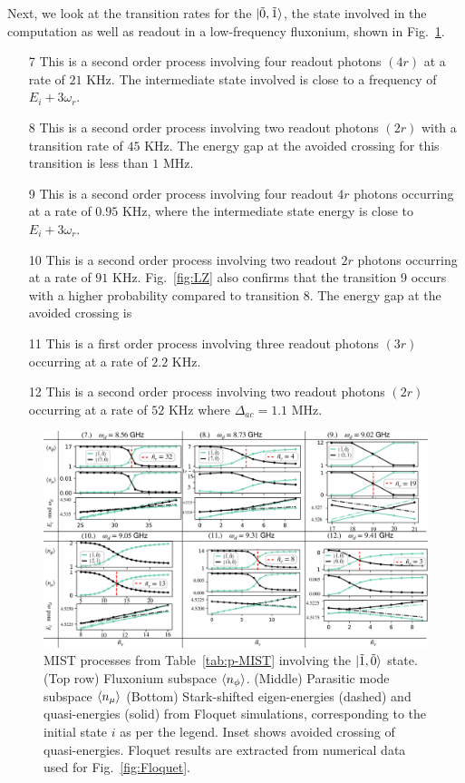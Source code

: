 \documentclass[%
reprint,
superscriptaddress,
 amsmath,amssymb,
 aps,
 prx,
longbibliography,
floatfix,
]{revtex4-2}
\begin{document}
Next, we look at the transition rates for the $\ket{\tilde{0},\tilde{1}}$, the state involved in the computation as well as readout in a low-frequency fluxonium, shown in Fig.~\ref{fig:Trans1}.
\begin{itemize}
    \item[7] This is a second order process involving four readout photons $(4r)$ at a rate of $21$ KHz. The intermediate state involved is close to a frequency of $E_i+3\omega_r$.
    \item[8] This is a second order process involving two readout photons $(2r)$ with a transition rate of $45$ KHz. The energy gap at the avoided crossing for this transition is less than $1$ MHz. 
    \item[9] This is a second order process involving four readout $4r$ photons occurring at a rate of $0.95$ KHz, where the intermediate state energy is close to $E_i+3\omega_r$. 
    \item[10] This is a second order process involving two readout $2r$ photons occurring at a rate of $91$ KHz. Fig.~\ref{fig:LZ} also confirms that the transition 9 occurs with a higher probability compared to transition 8. The energy gap at the avoided crossing is
    \item[11] This is a first order process involving three readout photons $(3r)$ occurring at a rate of $2.2$ KHz. 
    \item[12] This is a second order process involving two readout photons $(2r)$ occurring at a rate of $52$ KHz where $\Delta_{ac}=1.1$ MHz.
\end{itemize}
\begin{figure}
    \centering
    \includegraphics[width=1.0\textwidth]{Figures/Trans1.pdf}
    \caption{MIST processes from Table~\ref{tab:p-MIST} involving the $\ket{\tilde{1},\tilde{0}}$ state. (Top row) Fluxonium subspace $\braket{n_\phi}$. (Middle) Parasitic mode subspace $\braket{n_\mu}$ (Bottom) Stark-shifted eigen-energies (dashed) and quasi-energies (solid) from Floquet simulations, corresponding to the initial state $i$ as per the legend. Inset shows avoided crossing of quasi-energies. Floquet results are extracted from numerical data used for Fig.~\ref{fig:Floquet}.}
    \label{fig:Trans1}
\end{figure}
\end{document}
